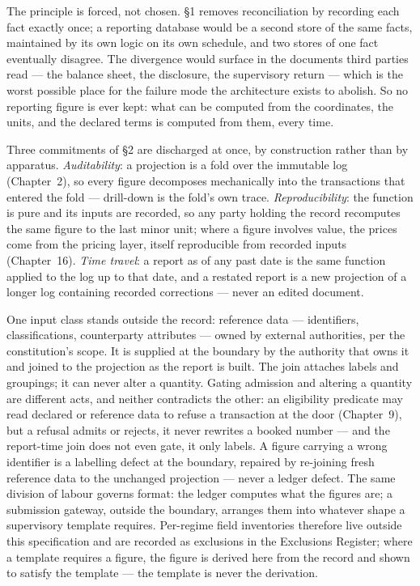 \documentclass[11pt,a4paper]{article}
\begin{document}
The principle is forced, not chosen. \S 1 removes reconciliation by recording
each fact exactly once; a reporting database would be a second store of the same
facts, maintained by its own logic on its own schedule, and two stores of one
fact eventually disagree. The divergence would surface in the documents third
parties read --- the balance sheet, the disclosure, the supervisory return ---
which is the worst possible place for the failure mode the architecture exists
to abolish. So no reporting figure is ever kept: what can be computed from the
coordinates, the units, and the declared terms is computed from them, every
time.

Three commitments of \S 2 are discharged at once, by construction rather than by
apparatus. \emph{Auditability}: a projection is a fold over the immutable log
(Chapter~2), so every figure decomposes mechanically into the transactions that
entered the fold --- drill-down is the fold's own trace. \emph{Reproducibility}:
the function is pure and its inputs are recorded, so any party holding the
record recomputes the same figure to the last minor unit; where a figure
involves value, the prices come from the pricing layer, itself reproducible from
recorded inputs (Chapter~16). \emph{Time travel}: a report as of any past date
is the same function applied to the log up to that date, and a restated report
is a new projection of a longer log containing recorded corrections --- never an
edited document.

One input class stands outside the record: reference data --- identifiers,
classifications, counterparty attributes --- owned by external authorities, per
the constitution's scope. It is supplied at the boundary by the authority that
owns it and joined to the projection as the report is built. The join attaches
labels and groupings; it can never alter a quantity. Gating admission and altering a
quantity are different acts, and neither contradicts the other: an eligibility predicate
may read declared or reference data to refuse a transaction at the door (Chapter~9), but a
refusal admits or rejects, it never rewrites a booked number --- and the report-time join
does not even gate, it only labels. A figure carrying a wrong
identifier is a labelling defect at the boundary, repaired by re-joining fresh
reference data to the unchanged projection --- never a ledger defect. The same
division of labour governs format: the ledger computes what the figures are; a
submission gateway, outside the boundary, arranges them into whatever shape a
supervisory template requires. Per-regime field inventories therefore live
outside this specification and are recorded as exclusions in the Exclusions
Register; where a template requires a figure, the figure is derived here from
the record and shown to satisfy the template --- the template is never the
derivation.
\end{document}
